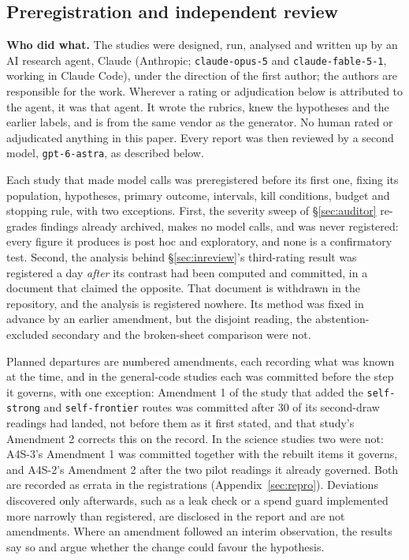 \subsection{Preregistration and independent review}
\label{sec:methods-review}

\textbf{Who did what.} The studies were designed, run, analysed and written up by an AI research
agent, Claude (Anthropic; \texttt{claude-opus-5} and \texttt{claude-fable-5-1}, working in Claude
Code), under the direction of the first author; the authors are responsible for the work. Wherever a rating or
adjudication below is attributed to the agent, it was that agent. It wrote the rubrics,
knew the hypotheses and the earlier labels, and is from the same vendor as the generator.
No human rated or adjudicated anything in this paper. Every report was then reviewed by a
second model, \texttt{gpt-6-astra}, as described below.

Each study that made model calls was preregistered before its first one, fixing its population,
hypotheses, primary outcome, intervals, kill conditions, budget and stopping rule, with two
exceptions. First, the severity sweep of \S\ref{sec:auditor} re-grades findings already archived,
makes no model calls, and was never registered: every figure it produces is post hoc and
exploratory, and none is a confirmatory test. Second, the analysis behind
\S\ref{sec:inreview}'s third-rating result was registered a day \emph{after} its contrast had been
computed and committed, in a document that claimed the opposite. That document is withdrawn in
the repository, and the analysis is registered nowhere. Its method was fixed in advance by an
earlier amendment, but the disjoint reading, the abstention-excluded secondary and the
broken-sheet comparison were not.

Planned departures are numbered amendments, each recording what was known at the time, and in the
general-code studies each was committed before the step it governs, with one exception: Amendment 1 of the study that added the \texttt{self-strong} and \texttt{self-frontier} routes was committed after 30 of its second-draw readings had landed, not before them as it first stated, and that study's Amendment 2 corrects this on the record. In the science studies two were not: A4S-3's Amendment 1 was committed together with the rebuilt items it governs, and A4S-2's
Amendment 2 after the two pilot readings it already governed. Both are recorded as errata in the
registrations (Appendix~\ref{sec:repro}). Deviations discovered only afterwards, such as a leak check or a spend
guard implemented more narrowly than registered, are disclosed in the report and are not
amendments. Where an amendment followed an interim observation, the results say so and argue
whether the change could favour the hypothesis.

